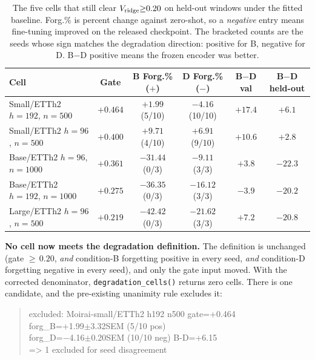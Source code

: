 \begin{table}[ht]
\centering\footnotesize
\caption{The five cells that still clear $V_{\text{ridge}}{\geq}0.20$ on
held-out windows under the fitted baseline. Forg.\% is percent change against
zero-shot, so a \emph{negative} entry means fine-tuning improved on the
released checkpoint. The bracketed counts are the seeds whose sign matches the
degradation direction: positive for B, negative for D. B$-$D positive means
the frozen encoder was better.}
\label{tab:gate_survivors}
\begin{tabular}{@{}lccccc@{}}
\toprule
Cell & Gate & B Forg.\% ($+$) & D Forg.\% ($-$) & B$-$D val & B$-$D held-out \\
\midrule
Small/ETTh2 $h{=}192$, $n{=}500$  & $+0.464$ & $+1.99$ (5/10)  & $-4.16$ (10/10) & $+17.4$ & $+6.1$ \\
Small/ETTh2 $h{=}96$, $n{=}500$   & $+0.400$ & $+9.71$ (4/10)  & $+6.91$ (9/10)  & $+10.6$ & $+2.8$ \\
Base/ETTh2 $h{=}96$, $n{=}1000$   & $+0.361$ & $-31.44$ (0/3)  & $-9.11$ (3/3)   & $+3.8$  & $-22.3$ \\
Base/ETTh2 $h{=}192$, $n{=}1000$  & $+0.275$ & $-36.35$ (0/3)  & $-16.12$ (3/3)  & $-3.9$  & $-20.2$ \\
Large/ETTh2 $h{=}96$, $n{=}500$   & $+0.219$ & $-42.42$ (0/3)  & $-21.62$ (3/3)  & $+7.2$  & $-20.8$ \\
\bottomrule
\end{tabular}
\end{table}

\textbf{No cell now meets the degradation definition.} The definition is
unchanged (gate ${\geq}\,0.20$, \emph{and} condition-B forgetting positive
in every seed, \emph{and} condition-D forgetting negative in every seed), and
only the gate input moved. With the corrected denominator,
\texttt{degradation\_cells()} returns zero cells. There is one candidate, and
the pre-existing unanimity rule excludes it:

\begin{quote}\small\ttfamily
excluded: Moirai-small/ETTh2 h192 n500 \quad gate=+0.464\\
\hspace*{2em}forg\_B=+1.99$\pm$3.32SEM (5/10 pos)\\
\hspace*{2em}forg\_D=$-$4.16$\pm$0.20SEM (10/10 neg) \quad B-D=+6.15\\
=> 1 excluded for seed disagreement
\end{quote}

